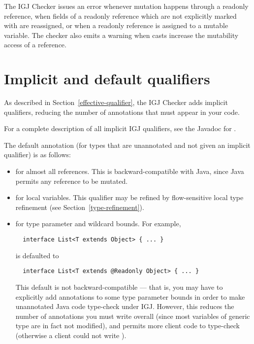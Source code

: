 The IGJ Checker issues an error whenever mutation happens through a
readonly reference, when fields of a readonly reference which are not
explicitly marked with  are
reassigned, or when a readonly reference is assigned to a mutable
variable.  The checker also emits a warning when casts increase the
mutability access of a reference.



\section{Implicit and default qualifiers\label{igj-implicit-qualifiers}}

As described in Section~\ref{effective-qualifier}, the IGJ Checker
adds implicit qualifiers, reducing the number of annotations that must
appear in your code.

For a complete description of all implicit IGJ qualifiers, see the
Javadoc for .

The default annotation (for types that are unannotated and not given an
implicit qualifier) is as follows:
\begin{itemize}
\item
   for almost all references.  This is backward-compatible
  with Java, since Java permits any reference to be mutated.
\item
   for local variables.  This qualifier may be refined by
  flow-sensitive local type refinement (see Section~\ref{type-refinement}).
\item
   for type parameter and wildcard bounds.  For example,

\begin{Verbatim}
  interface List<T extends Object> { ... }
\end{Verbatim}

\noindent
is defaulted to

\begin{Verbatim}
  interface List<T extends @Readonly Object> { ... }
\end{Verbatim}

This default is not backward-compatible --- that is, you may have to
explicitly add  annotations to some type parameter bounds in
order to make unannotated Java code type-check under IGJ\@.  However, this
reduces the number of annotations you must write overall (since most
variables of generic type are in fact not modified), and permits more
client code to type-check (otherwise a client could not write
).

\end{itemize}



